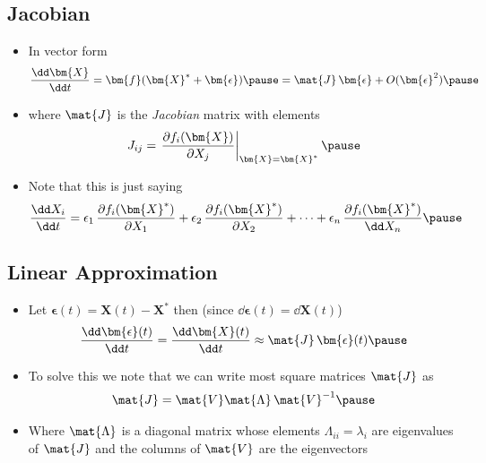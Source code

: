 \begin{slide}
\section[-2]{Jacobian}

\begin{PauseHighLight}
  \begin{itemize}
  \item In vector form
    \begin{align*}
      \frac{\dd \bm{X}}{\dd t} = \bm{f}(\bm{X}^*+\bm{\epsilon})\pause
      =  \mat{J}\, \bm{\epsilon} + O(\bm{\epsilon}^2)\pause
    \end{align*}
  \item where $\mat{J}$ is the \emph{Jacobian} matrix with elements
    \begin{align*}
      J_{ij} = \left. \frac{\partial f_i(\bm{X})}{\partial X_j}\right|_{\bm{X}=\bm{X}^*}\pause
    \end{align*}
  \item Note that this is just saying
    \begin{align*}
       \frac{\dd X_i}{\dd t} =  \epsilon_1\,\frac{\partial
      f_i(\bm{X}^*)}{\partial X_1} +  \epsilon_2\,\frac{\partial
      f_i(\bm{X}^*)}{\partial X_2} + \cdots +  \epsilon_n\,\frac{\partial
      f_i(\bm{X}^*)}{\dd X_n}\pause
    \end{align*}
  \end{itemize}
\end{PauseHighLight}

\end{slide}


\begin{slide}
\section{Linear Approximation}

\begin{PauseHighLight}
  \begin{itemize}
  \item Let $\bm{\epsilon}(t) = \bm{X}(t) - \bm{X}^*$ then (since $\dd
    \bm{\epsilon}(t) = \dd \bm{X}(t)$)
    \begin{align*}
      \frac{\dd \bm{\epsilon}(t)}{\dd t} = \frac{\dd \bm{X}(t)}{\dd t}
      \approx \mat{J}\, \bm{\epsilon}(t)\pause
    \end{align*}
  \item To solve this we note that we can write most square matrices
    $\mat{J}$ as
    \begin{align*}
      \mat{J} = \mat{V} \mat{\Lambda}\,\mat{V}^{-1}\pause
    \end{align*}
  \item Where $\mat{\Lambda}$ is a diagonal matrix whose elements
    $\Lambda_{ii}=\lambda_i$ are eigenvalues of $\mat{J}$ and the
    columns of $\mat{V}$ are the eigenvectors\pause
  \end{itemize}
\end{PauseHighLight}

\end{slide}


